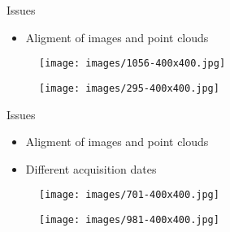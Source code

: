 \documentclass[
  ignorenonframetext,
]{beamer}
\providecommand{\tightlist}{%
  \setlength{\itemsep}{0pt}\setlength{\parskip}{0pt}}\usepackage{longtable,booktabs,array}
\begin{document}
\begin{frame}{Issues}
\label{issues}
\begin{itemize}
\tightlist
\item
  Aligment of images and point clouds
\end{itemize}

\begin{figure}

\begin{minipage}{0.50\linewidth}
\texttt{[image: images/1056-400x400.jpg]} \end{minipage}%
%
\begin{minipage}{0.50\linewidth}
\texttt{[image: images/295-400x400.jpg]} \end{minipage}%

\end{figure}%
\end{frame}

\begin{frame}{Issues}
\label{issues-1}
\begin{itemize}
\tightlist
\item
  Aligment of images and point clouds
\item
  Different acquisition dates
\end{itemize}

\begin{figure}

\begin{minipage}{0.50\linewidth}
\texttt{[image: images/701-400x400.jpg]} \end{minipage}%
%
\begin{minipage}{0.50\linewidth}
\texttt{[image: images/981-400x400.jpg]} \end{minipage}%

\end{figure}%
\end{frame}
\end{document}
